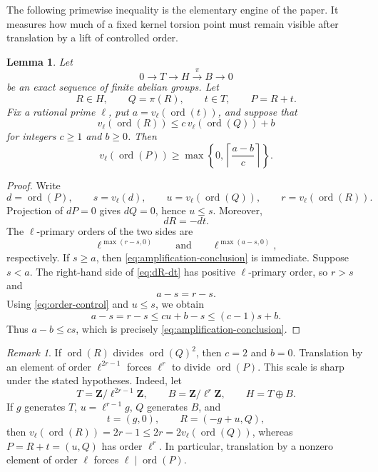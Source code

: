 \documentclass[11pt,letterpaper,reqno]{amsart}
\newtheorem{lemma}[theorem]{Lemma}
\theoremstyle{definition}
\theoremstyle{remark}
\newtheorem{remark}[theorem]{Remark}
\newcommand{\Z}{\mathbf Z}
\newcommand{\ord}{\operatorname{ord}}
\begin{document}
The following primewise inequality is the elementary engine of the paper.
It measures how much of a fixed kernel torsion point must remain visible after
translation by a lift of controlled order.

\begin{lemma}\label{lem:amplification}
Let
\[
 0\longrightarrow T\longrightarrow H\xrightarrow{\pi}B\longrightarrow0
\]
be an exact sequence of finite abelian groups.  Let
\[
 R\in H,\qquad Q=\pi(R),\qquad t\in T,\qquad P=R+t.
\]
Fix a rational prime $\ell$, put $a=v_\ell(\ord(t))$, and suppose that
\begin{equation}\label{eq:order-control}
 v_\ell(\ord(R))
 \le c\,v_\ell(\ord(Q))+b
\end{equation}
for integers $c\ge1$ and $b\ge0$.  Then
\begin{equation}\label{eq:amplification-conclusion}
 v_\ell(\ord(P))
 \ge
 \max\left\{0,\left\lceil\frac{a-b}{c}\right\rceil\right\}.
\end{equation}
\end{lemma}

\begin{proof}
Write
\[
 d=\ord(P),\qquad s=v_\ell(d),\qquad
 u=v_\ell(\ord(Q)),\qquad r=v_\ell(\ord(R)).
\]
Projection of $dP=0$ gives $dQ=0$, hence $u\le s$.  Moreover,
\begin{equation}\label{eq:dR-dt}
 dR=-dt.
\end{equation}
The $\ell$-primary orders of the two sides are
\[
 \ell^{\max(r-s,0)}
 \qquad\text{and}\qquad
 \ell^{\max(a-s,0)},
\]
respectively.  If $s\ge a$, then \eqref{eq:amplification-conclusion} is
immediate.  Suppose $s<a$.  The right-hand side of \eqref{eq:dR-dt} has
positive $\ell$-primary order, so $r>s$ and
\[
 a-s=r-s.
\]
Using \eqref{eq:order-control} and $u\le s$, we obtain
\[
 a-s=r-s\le cu+b-s\le(c-1)s+b.
\]
Thus $a-b\le cs$, which is precisely
\eqref{eq:amplification-conclusion}.
\end{proof}

\begin{remark}
If $\ord(R)$ divides $\ord(Q)^2$, then $c=2$ and $b=0$.  Translation by an
element of order $\ell^{2r-1}$ forces $\ell^r$ to divide $\ord(P)$.  This
scale is sharp under the stated hypotheses.  Indeed, let
\[
 T=\Z/\ell^{2r-1}\Z,\qquad B=\Z/\ell^r\Z,\qquad H=T\oplus B.
\]
If $g$ generates $T$, $u=\ell^{r-1}g$, $Q$ generates $B$, and
\[
 t=(g,0),\qquad R=(-g+u,Q),
\]
then $v_\ell(\ord(R))=2r-1\le2r=2v_\ell(\ord(Q))$, whereas
$P=R+t=(u,Q)$ has order $\ell^r$.  In particular, translation by a nonzero
element of order $\ell$ forces $\ell\mid\ord(P)$.
\end{remark}
\end{document}
